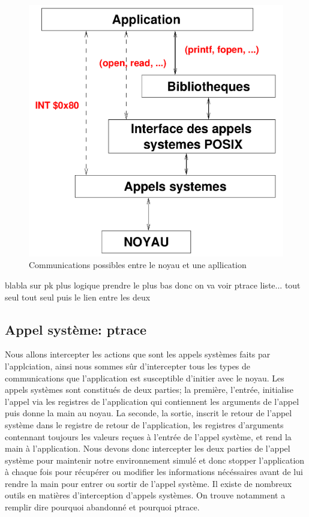 \begin{figure}[H]
 \centering
 \includegraphics[scale=0.20]{Pictures/Communication_application_noyau.png}
 \caption{Communications possibles entre le noyau et une apllication}
 \label{AS_Communication}
\end{figure}


blabla sur pk plus logique prendre le plus bas donc on va voir ptrace
 liste... tout seul tout seul puis le lien entre
les deux
\subsection{Appel système: ptrace}
Nous allons intercepter les actions que sont les appels systèmes faits par
l'applciation, ainsi nous sommes sûr d'intercepter tous les types de
communications que l'application est susceptible d'initier avec le noyau. Les
appels systèmes sont constitués de deux parties; la première, l'entrée,
initialise l'appel via les registres de l'application qui contiennent les
arguments de l'appel puis donne la main au noyau. La seconde, la sortie, inscrit
le retour de l'appel système dans le registre de retour de l'application, les
registres d'arguments contennant toujours les valeurs reçues à l'entrée de
l'appel système, et rend la main à l'application. Nous devons donc intercepter
les deux parties de l'appel système pour maintenir notre environnement simulé et
donc stopper l'application à chaque fois pour récupérer ou modifier les
informations nécéssaires avant de lui rendre la main pour entrer ou sortir de
l'appel système. Il existe de nombreux outils en matières d'interception
d'appels systèmes. On trouve notamment {\color{green} a remplir dire pourquoi
  abandonné et pourquoi ptrace}.

